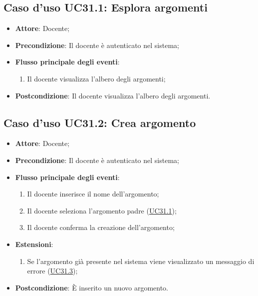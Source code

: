 \documentclass[12pt,a4paper]{article}
\begin{document}
\subsection{Caso d'uso UC31.1: Esplora argomenti}

\begin{itemize}

\item \textbf{Attore}: Docente; 
\item \textbf{Precondizione}: Il docente è autenticato nel sistema;

\item \textbf{Flusso principale degli eventi}:
\begin{enumerate}
	\item Il docente visualizza l'albero degli argomenti;
	
\end{enumerate}
\item \textbf{Postcondizione}: Il docente visualizza l'albero degli argomenti.
\end{itemize}
\hypertarget{UC31.2}{}
\subsection{Caso d'uso UC31.2: Crea argomento}

\begin{itemize}

\item \textbf{Attore}: Docente; 
\item \textbf{Precondizione}: Il docente è autenticato nel sistema;

\item \textbf{Flusso principale degli eventi}:
\begin{enumerate}
	\item Il docente inserisce il nome dell'argomento;
	\item Il docente seleziona l'argomento padre (\hyperlink{UC31.1}{UC31.1});
	\item Il docente conferma la creazione dell'argomento;
	
\end{enumerate}
\item \textbf{Estensioni}:
\begin{enumerate}
	\item Se l'argomento già presente nel sistema viene visualizzato un messaggio di errore (\hyperlink{UC31.3}{UC31.3});
	
\end{enumerate}
\item \textbf{Postcondizione}: È inserito un nuovo argomento.
\end{itemize}
\hypertarget{UC31.3}{}
\end{document}
